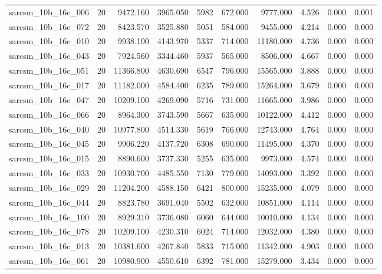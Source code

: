 \begin{tabular}{lrrrrrrrrr}
sarcsm\_10b\_16c\_006 & 20 & 9472.160 & 3965.050 & 5982 & 672.000 & 9777.000 & 4.526 & 0.000 & 0.001 \\
sarcsm\_10b\_16c\_072 & 20 & 8423.570 & 3525.880 & 5051 & 584.000 & 9455.000 & 4.214 & 0.000 & 0.000 \\
sarcsm\_10b\_16c\_010 & 20 & 9938.100 & 4143.970 & 5337 & 714.000 & 11180.000 & 4.736 & 0.000 & 0.000 \\
sarcsm\_10b\_16c\_043 & 20 & 7924.560 & 3344.460 & 5937 & 565.000 & 8506.000 & 4.667 & 0.000 & 0.000 \\
sarcsm\_10b\_16c\_051 & 20 & 11366.800 & 4630.690 & 6547 & 796.000 & 15565.000 & 3.888 & 0.000 & 0.000 \\
sarcsm\_10b\_16c\_017 & 20 & 11182.000 & 4584.400 & 6235 & 789.000 & 15264.000 & 3.679 & 0.000 & 0.000 \\
sarcsm\_10b\_16c\_047 & 20 & 10209.100 & 4269.090 & 5716 & 731.000 & 11665.000 & 3.986 & 0.000 & 0.000 \\
sarcsm\_10b\_16c\_066 & 20 & 8964.300 & 3743.590 & 5667 & 635.000 & 10122.000 & 4.412 & 0.000 & 0.000 \\
sarcsm\_10b\_16c\_040 & 20 & 10977.800 & 4514.330 & 5619 & 766.000 & 12743.000 & 4.764 & 0.000 & 0.000 \\
sarcsm\_10b\_16c\_045 & 20 & 9906.220 & 4137.720 & 6308 & 690.000 & 11495.000 & 4.370 & 0.000 & 0.000 \\
sarcsm\_10b\_16c\_015 & 20 & 8890.600 & 3737.330 & 5255 & 635.000 & 9973.000 & 4.574 & 0.000 & 0.000 \\
sarcsm\_10b\_16c\_033 & 20 & 10930.700 & 4485.550 & 7130 & 779.000 & 14093.000 & 3.392 & 0.000 & 0.000 \\
sarcsm\_10b\_16c\_029 & 20 & 11204.200 & 4588.150 & 6421 & 800.000 & 15235.000 & 4.079 & 0.000 & 0.000 \\
sarcsm\_10b\_16c\_044 & 20 & 8823.780 & 3691.040 & 5502 & 632.000 & 10851.000 & 4.114 & 0.000 & 0.000 \\
sarcsm\_10b\_16c\_100 & 20 & 8929.310 & 3736.080 & 6060 & 644.000 & 10010.000 & 4.134 & 0.000 & 0.000 \\
sarcsm\_10b\_16c\_078 & 20 & 10209.100 & 4230.310 & 6024 & 714.000 & 12032.000 & 4.380 & 0.000 & 0.000 \\
sarcsm\_10b\_16c\_013 & 20 & 10381.600 & 4267.840 & 5833 & 715.000 & 11342.000 & 4.903 & 0.000 & 0.000 \\
sarcsm\_10b\_16c\_061 & 20 & 10980.900 & 4550.610 & 6392 & 781.000 & 15279.000 & 3.434 & 0.000 & 0.000 \\

\end{tabular}
